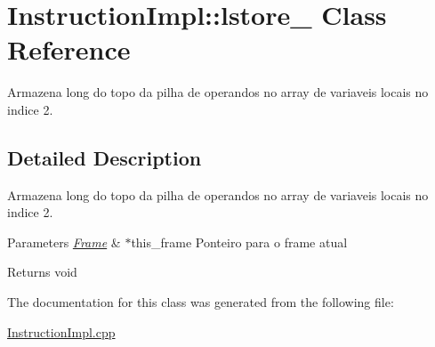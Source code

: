 \hypertarget{class_instruction_impl_1_1lstore__2}{}\section{Instruction\+Impl\+:\+:lstore\+\_ Class Reference}
\label{class_instruction_impl_1_1lstore__2}


Armazena long do topo da pilha de operandos no array de variaveis locais no indice 2.  




\subsection{Detailed Description}
Armazena long do topo da pilha de operandos no array de variaveis locais no indice 2. 


\begin{DoxyParams}{Parameters}
{\em \hyperlink{struct_frame}{Frame}} & $\ast$this\+\_\+frame Ponteiro para o frame atual \\
\hline
\end{DoxyParams}
\begin{DoxyReturn}{Returns}
void 
\end{DoxyReturn}


The documentation for this class was generated from the following file\+:\begin{DoxyCompactItemize}
\item 
\hyperlink{_instruction_impl_8cpp}{Instruction\+Impl.\+cpp}\end{DoxyCompactItemize}
